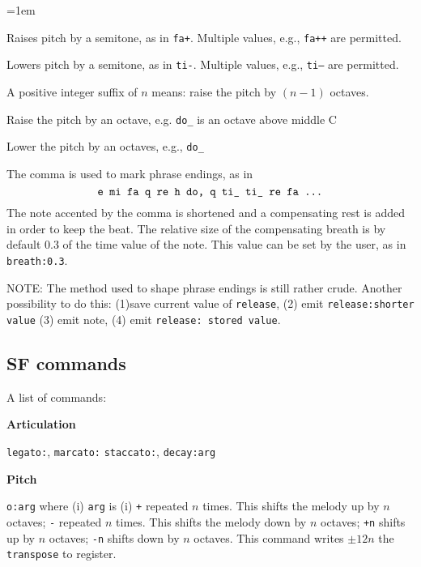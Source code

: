 \documentclass[11pt]{amsart}
\begin{document}
\begin{description}
\parskip=1em

\item[{\tt +}]  Raises pitch by a semitone, as in {\tt fa+}. Multiple
values, e.g., {\tt fa++} are permitted.

\item[{\tt -}]  Lowers pitch by a semitone, as in {\tt ti-}. Multiple
values, e.g., {\tt ti--} are permitted.

\item[{\tt <n>} ] A positive integer suffix of $n$ means: raise the pitch
by $(n-1)$ octaves.

\item[{\tt\^{}}]  Raise the pitch
by an octave, e.g. {\tt do\_} is an octave above middle C


\item[{\tt\_{}} ] Lower the pitch
by an octaves, e.g., {\tt do\_ }

\item[{\tt ,}]   The comma is used to mark phrase endings, as in 
\[
  \hbox{{\tt e mi fa q re h do, q ti\_ ti\_ re fa ...}}
\]
The note accented by the comma is shortened and a compensating rest is added
in order to keep the beat.  The relative size of the compensating breath
is by default 0.3 of the time value of the note.  This value can be set
by the user, as in {\tt breath:0.3}.  

\end{description}

NOTE:  The method used to shape phrase endings is still rather crude.  Another 
possibility to do this: (1)save current value of {\tt release}, 
(2) emit {\tt release:shorter value} (3) emit note, (4) emit {\tt release: stored value}.



\subsection{SF commands}

A list of commands:

{\bf Articulation}

{\tt legato:}, {\tt marcato:} {\tt staccato:}, {\tt decay:arg}


{\bf Pitch}

{\tt o:arg} where (i) {\tt arg} is (i) {\tt +} repeated $n$ times.  This shifts
the melody up by $n$ octaves; {\tt -} repeated $n$ times.  This shifts
the melody down by $n$ octaves; {\tt +n} shifts up by $n$ octaves;
{\tt -n} shifts down by $n$ octaves.  This command writes $\pm 12n$ the
{\tt transpose} to register.
\end{document}
